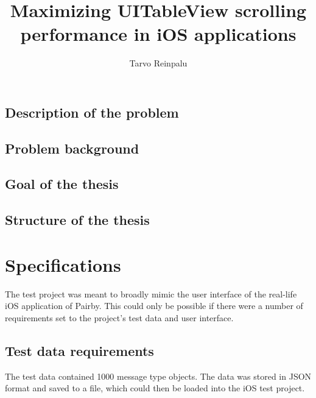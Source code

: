 \documentclass[a4paper,12pt]{article}
\begin{document}
\begin{itkTitlePage}
\title{Maximizing UITableView scrolling performance in iOS applications}
\author{Tarvo Reinpalu}
\end{itkTitlePage}


\itkMakeAuthorDeclaration

\clearpage
\thispagestyle{empty}
\tableofcontents
\newpage


\newpage

\subsection*{Description of the problem}

\subsection*{Problem background}

\subsection*{Goal of the thesis}

\subsection*{Structure of the thesis}

\newpage
\section{Specifications}
The test project was meant to broadly mimic the user interface of the real-life iOS application of Pairby. This
could only be possible if there were a number of requirements set to the project's test data and user interface.

\subsection{Test data requirements}
The test data contained 1000 message type objects. The data was stored in JSON format and saved to a file,
which could then be loaded into the iOS test project.
\end{document}
